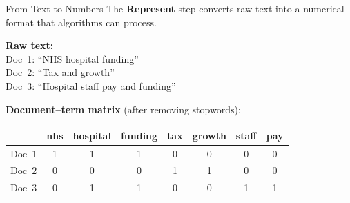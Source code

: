 \documentclass[aspectratio=169]{beamer}
\begin{document}
\begin{frame}{From Text to Numbers}
    \small
    The \textbf{Represent} step converts raw text into a numerical format that algorithms can process.

    \vspace{0.2cm}
    \textbf{Raw text:}\\[0.1cm]
    {\footnotesize
    Doc~1: ``NHS hospital funding''\\
    Doc~2: ``Tax and growth''\\
    Doc~3: ``Hospital staff pay and funding''}

    \vspace{0.2cm}
    \textbf{Document--term matrix} (after removing stopwords):

    \vspace{0.1cm}
    \begin{center}
    \scriptsize
    \begin{tabular}{@{}lccccccc@{}}
        \toprule
        & \textbf{nhs} & \textbf{hospital} & \textbf{funding} & \textbf{tax} & \textbf{growth} & \textbf{staff} & \textbf{pay} \\
        \midrule
        Doc~1 & 1 & 1 & 1 & 0 & 0 & 0 & 0 \\
        Doc~2 & 0 & 0 & 0 & 1 & 1 & 0 & 0 \\
        Doc~3 & 0 & 1 & 1 & 0 & 0 & 1 & 1 \\
        \bottomrule
    \end{tabular}
    \end{center}
\end{frame}
\end{document}
